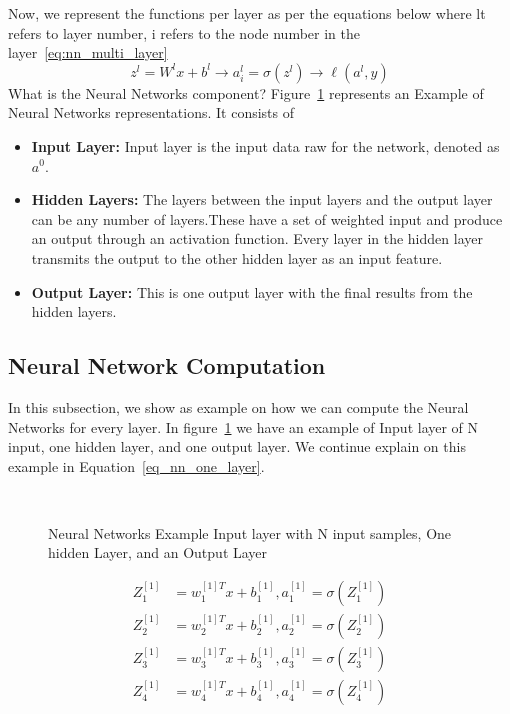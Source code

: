 Now, we represent the functions per layer as per the equations below where lt refers to layer number, i refers to the node number in the layer~\eqref{eq:nn_multi_layer}%
%
\begin{equation}\label{eq:nn_multi_layer}
\boxed{z^l = W^l x + b^l} \longrightarrow \boxed{a_i^l = \sigma(z^l)} \longrightarrow \boxed{\ell(a^l,y)}
\end{equation}%
%
What is the Neural Networks component?
Figure~\ref{Fig:NNExample} represents an Example of Neural Networks representations. It consists of

\begin{itemize}
\item \textbf{Input Layer:} Input layer is the input data raw for the network, denoted as $a^0$.
\item \textbf{Hidden Layers:} The layers between the input layers and the output layer can be any number of layers.These have a set of weighted input and produce an output through an activation function. Every layer in the hidden layer transmits the output to the other hidden layer as an input feature.
\item \textbf{Output Layer:} This is one output layer with the final results from the hidden layers.
\end{itemize}

\subsection{Neural Network Computation}

In this subsection, we show as example on how we can compute the Neural Networks for every layer. In figure~\ref{Fig:NNExample} we have an example of Input layer of N input, one hidden layer, and one output layer. We continue explain on this example in Equation~\eqref{eq_nn_one_layer}.%
\begin{figure}[!t]

\caption{Neural Networks Example Input layer with N input samples, One hidden Layer, and an Output Layer}~\label{Fig:NNExample}
\end{figure}%
\begin{subequations}\label{eq_nn_one_layer}
\begin{align}
Z_1^{[1]} & = w_1^{[1]T} x + b_1^{[1]} , a_1^{[1]} = \sigma(Z_1^{[1]}) \\
Z_2^{[1]} & = w_2^{[1]T} x + b_2^{[1]} , a_2^{[1]} = \sigma(Z_2^{[1]})\\
Z_3^{[1]} & = w_3^{[1]T} x + b_3^{[1]} , a_3^{[1]} = \sigma(Z_3^{[1]})\\
Z_4^{[1]} & = w_4^{[1]T} x + b_4^{[1]} , a_4^{[1]} = \sigma(Z_4^{[1]})
\end{align}
\end{subequations}%

